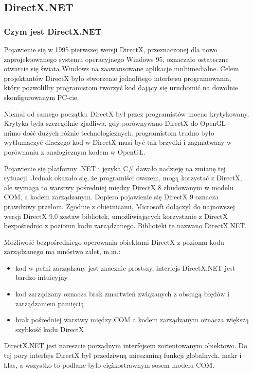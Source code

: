 ﻿\subsection{DirectX.NET}

\subsubsection{Czym jest DirectX.NET}

Pojawienie się w 1995 pierwszej wersji DirectX, przeznaczonej dla nowo zaprojektowanego systemu 
operacyjnego Windows 95, oznaczało ostateczne otwarcie się świata Windows na zaawansowane 
aplikacje multimedialne. Celem projektantów DirectX było stworzenie jednolitego interfejsu 
programowania, który pozwoliłby programistom tworzyć kod dający się uruchomić na dowolnie 
skonfigurowanym PC-cie. 

Niemal od samego początku DirectX był przez programistów mocno krytykowany. 
Krytyka była szczególnie zjadliwa, gdy porównywano DirectX do OpenGL - mimo dość dużych różnic 
technologicznych, programistom trudno było wytłumaczyć dlaczego kod w DirectX musi być tak brzydki i 
zagmatwany w porównaniu z analogicznym kodem w OpenGL. 	

Pojawienie się platformy .NET i języka C\# dawało nadzieję na zmianę tej sytuacji. Jednak 
okazało się, że programiści owszem, mogą korzystać z DirectX, ale wymaga to warstwy pośredniej 
między DirectX 8 zbudowanym w modelu COM, a kodem zarządzanym. Dopiero pojawienie się DirectX 9 
oznacza prawdziwy przełom. Zgodnie z obietnicami, Microsoft dołączył do najnowszej wersji 
DirectX 9.0 zestaw bibliotek, umożliwiających korzystanie z DirectX bezpośrednio z poziomu kodu 
zarządzanego. Biblioteki te nazwano DirectX.NET. 

Możliwość bezpośredniego operowania obiektami DirectX z poziomu kodu zarządzanego ma mnóstwo zalet, m.in.:
\begin{itemize}
\item kod w pełni zarządzany jest znacznie prostszy, interfejs DirectX.NET jest bardzo intuicyjny
\item kod zarządzany oznacza brak zmartwień związanych z obsługą błędów i zarządzaniem pamięcią
\item brak pośredniej warstwy między COM a kodem zarządzanym oznacza większą szybkość kodu DirectX
\end{itemize}

DirectX.NET jest nareszcie porządnym interfejsem zorientowanym obiektowo. Do tej pory interfejs 
DirectX był przedziwną mieszaniną funkcji globalnych, makr i klas, a wszystko to podlane było ciężkostrawnym 
sosem modelu COM.

